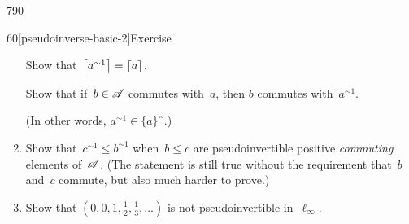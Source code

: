 \begin{parsec}{790}
\begin{point}{60}[pseudoinverse-basic-2]{Exercise}
\begin{enumerate}
Show that~$\left\lceil a^{\sim1}\right\rceil=\left\lceil a\right\rceil$.

Show that if~$b\in \mathscr{A}$ commutes with~$a$,
then $b$ commutes with~$a^{\sim 1}$.

(In other words, $a^{\sim1}\in\{a\}^{\square\square}$.)
\item
Show that~$c^{\sim1}\leq b^{\sim1}$
when~$b\leq c$ are pseudoinvertible positive \emph{commuting}
elements of~$\mathscr{A}$.
(The statement is still true without
the requirement that~$b$ and~$c$ commute,
but also much harder to prove.)


\item
Show that $(0,0,1,\frac{1}{2}, \frac{1}{3},\dotsc)$
is not pseudoinvertible in~$\ell_\infty$.
\end{enumerate}
\end{point}
\end{parsec}
